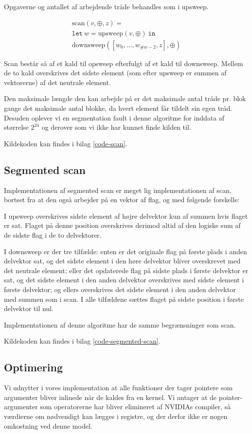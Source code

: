 Opgaverne og antallet af arbejdende tråde behandles som i upsweep.

\[
\begin{array}{l}
\mbox{scan}(v, \oplus, z) =\\
\mathtt{let\ } w = \mbox{upsweep}(v, \oplus) \mathtt{\ in}\\
\mbox{downsweep}([w_0, \ldots, w_{\#w-2}, z], \oplus)
\end{array}
\]

Scan består så af et kald til opsweep efterfulgt af et kald til downsweep.
Mellem de to kald overskrives det sidste element (som efter upsweep er
summen af vektorerne) af det neutrale element.

Den maksimale længde den kan arbejde på er det maksimale antal tråde pr. blok
gange det maksimale antal blokke, da hvert element får tildelt sin egen tråd.
Desuden oplever vi en segmentation fault i denne algoritme for inddata af størrelse
$2^24$ og derover som vi ikke har kunnet finde kilden til.

Kildekoden kan findes i bilag \ref{code-scan}.

\subsection{Segmented scan}

Implementationen af segmented scan er meget lig implementationen af scan,
bortset fra at den også arbejder på en vektor af flag, og med følgende forskelle: 

I upsweep overskrives sidste element af højre delvektor kun af summen hvis 
flaget er sat. Flaget på denne position overskrives derimod altid af den logiske
sum af de sidste flag i de to delvektorer.

I downsweep er der tre tilfælde: enten er det originale flag på første plads
i anden delvektor sat, og det sidste element i den høre delvektor bliver 
overskrevet med det neutrale element; eller det opdaterede flag på sidste
plads i første delvektor er sat, og det sidste element i den anden delvektor
overskrives med sidste element i første delvektor; og ellers overskrives
det sidste element i den anden delvektor med summen som i scan. I alle 
tilfældene sættes flaget på sidste position i første delvektor til nul.

Implementationen af denne algoritme har de samme begrænsninger som scan.

Kildekoden kan findes i bilag \ref{code-segmented-scan}.

\subsection{Optimering}

Vi udnytter i vores implementation at alle funktioner der tager pointere
som argumenter bliver inlinede \cite{cuda-guide} når de kaldes fra en kernel.
Vi antager at de pointer-argumenter som operatorerne har bliver elimineret
af NVIDIAs compiler, så værdierne om nødvendigt kan lægges i registre,
og der derfor ikke er nogen omkostning ved denne model.
